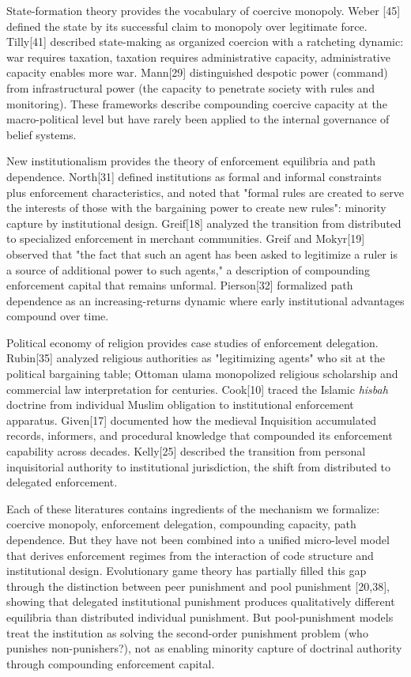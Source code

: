 \documentclass[12pt]{article}
\begin{document}
State-formation theory provides the vocabulary of coercive monopoly. Weber [45] defined the state by its successful claim to monopoly over legitimate force. Tilly[41] described state-making as organized coercion with a ratcheting dynamic: war requires taxation, taxation requires administrative capacity, administrative capacity enables more war. Mann[29] distinguished despotic power (command) from infrastructural power (the capacity to penetrate society with rules and monitoring). These frameworks describe compounding coercive capacity at the macro-political level but have rarely been applied to the internal governance of belief systems.

New institutionalism provides the theory of enforcement equilibria and path dependence. North[31] defined institutions as formal and informal constraints plus enforcement characteristics, and noted that "formal rules are created to serve the interests of those with the bargaining power to create new rules": minority capture by institutional design. Greif[18] analyzed the transition from distributed to specialized enforcement in merchant communities. Greif and Mokyr[19] observed that "the fact that such an agent has been asked to legitimize a ruler is a source of additional power to such agents," a description of compounding enforcement capital that remains unformal. Pierson[32] formalized path dependence as an increasing-returns dynamic where early institutional advantages compound over time.

Political economy of religion provides case studies of enforcement delegation. Rubin[35] analyzed religious authorities as "legitimizing agents" who sit at the political bargaining table; Ottoman ulama monopolized religious scholarship and commercial law interpretation for centuries. Cook[10] traced the Islamic \emph{hisbah} doctrine from individual Muslim obligation to institutional enforcement apparatus. Given[17] documented how the medieval Inquisition accumulated records, informers, and procedural knowledge that compounded its enforcement capability across decades. Kelly[25] described the transition from personal inquisitorial authority to institutional jurisdiction, the shift from distributed to delegated enforcement.

Each of these literatures contains ingredients of the mechanism we formalize: coercive monopoly, enforcement delegation, compounding capacity, path dependence. But they have not been combined into a unified micro-level model that derives enforcement regimes from the interaction of code structure and institutional design. Evolutionary game theory has partially filled this gap through the distinction between peer punishment and pool punishment [20,38], showing that delegated institutional punishment produces qualitatively different equilibria than distributed individual punishment. But pool-punishment models treat the institution as solving the second-order punishment problem (who punishes non-punishers?), not as enabling minority capture of doctrinal authority through compounding enforcement capital.
\end{document}
